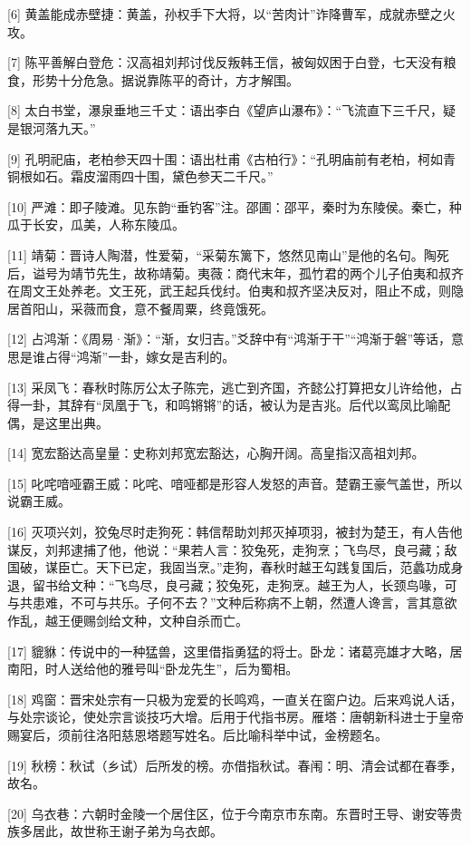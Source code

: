 \documentclass[12pt,UTF8]{ctexbook}
\begin{document}
[6] 黄盖能成赤壁捷：黄盖，孙权手下大将，以“苦肉计”诈降曹军，成就赤壁之火攻。

[7] 陈平善解白登危：汉高祖刘邦讨伐反叛韩王信，被匈奴困于白登，七天没有粮食，形势十分危急。据说靠陈平的奇计，方才解围。

[8] 太白书堂，瀑泉垂地三千丈：语出李白《望庐山瀑布》：“飞流直下三千尺，疑是银河落九天。”

[9] 孔明祀庙，老柏参天四十围：语出杜甫《古柏行》：“孔明庙前有老柏，柯如青铜根如石。霜皮溜雨四十围，黛色参天二千尺。”

[10] 严滩：即子陵滩。见东韵“垂钓客”注。邵圃：邵平，秦时为东陵侯。秦亡，种瓜于长安，瓜美，人称东陵瓜。

[11] 靖菊：晋诗人陶潜，性爱菊，“采菊东篱下，悠然见南山”是他的名句。陶死后，谥号为靖节先生，故称靖菊。夷薇：商代末年，孤竹君的两个儿子伯夷和叔齐在周文王处养老。文王死，武王起兵伐纣。伯夷和叔齐坚决反对，阻止不成，则隐居首阳山，采薇而食，意不餐周粟，终竟饿死。

[12] 占鸿渐：《周易·渐》：“渐，女归吉。”爻辞中有“鸿渐于干”“鸿渐于磐”等话，意思是谁占得“鸿渐”一卦，嫁女是吉利的。

[13] 采凤飞：春秋时陈厉公太子陈完，逃亡到齐国，齐懿公打算把女儿许给他，占得一卦，其辞有“凤凰于飞，和鸣锵锵”的话，被认为是吉兆。后代以鸾凤比喻配偶，是这里出典。

[14] 宽宏豁达高皇量：史称刘邦宽宏豁达，心胸开阔。高皇指汉高祖刘邦。

[15] 叱咤喑哑霸王威：叱咤、喑哑都是形容人发怒的声音。楚霸王豪气盖世，所以说霸王威。

[16] 灭项兴刘，狡兔尽时走狗死：韩信帮助刘邦灭掉项羽，被封为楚王，有人告他谋反，刘邦逮捕了他，他说：“果若人言：狡兔死，走狗烹；飞鸟尽，良弓藏；敌国破，谋臣亡。天下已定，我固当烹。”走狗，春秋时越王勾践复国后，范蠡功成身退，留书给文种：“飞鸟尽，良弓藏；狡兔死，走狗烹。越王为人，长颈鸟喙，可与共患难，不可与共乐。子何不去？”文种后称病不上朝，然遭人谗言，言其意欲作乱，越王便赐剑给文种，文种自杀而亡。

[17] 貔貅：传说中的一种猛兽，这里借指勇猛的将士。卧龙：诸葛亮雄才大略，居南阳，时人送给他的雅号叫“卧龙先生”，后为蜀相。

[18] 鸡窗：晋宋处宗有一只极为宠爱的长鸣鸡，一直关在窗户边。后来鸡说人话，与处宗谈论，使处宗言谈技巧大增。后用于代指书房。雁塔：唐朝新科进士于皇帝赐宴后，须前往洛阳慈恩塔题写姓名。后比喻科举中试，金榜题名。

[19] 秋榜：秋试（乡试）后所发的榜。亦借指秋试。春闱：明、清会试都在春季，故名。

[20] 乌衣巷：六朝时金陵一个居住区，位于今南京市东南。东晋时王导、谢安等贵族多居此，故世称王谢子弟为乌衣郎。
\end{document}
